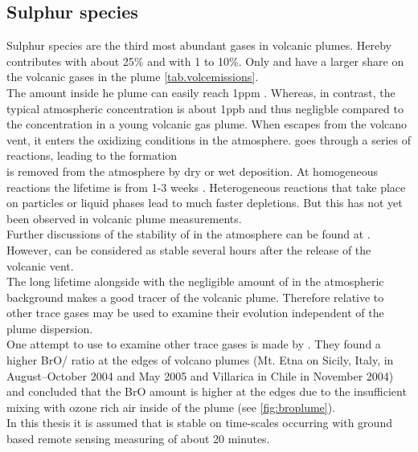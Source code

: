 \documentclass  [
  paper    = a4,
  BCOR     = 10mm,
  twoside,
  fontsize = 12pt,
  fleqn,
  toc      = bibnumbered,
  toc      = listofnumbered,
  numbers  = noendperiod,
  headings = normal,
  listof   = leveldown,
  version  = 3.03
]                                       {scrreprt}
\begin{document}
\subsection{Sulphur species\label{chap:so2}}
Sulphur species are the third most abundant gases in volcanic plumes. Hereby  contributes with about 25\% and  with 1 to 10\%. Only  and  have a larger share on the volcanic gases in the plume \cref{tab.volcemissions}.\\
The   amount inside he plume can easily reach 1ppm \citep{oppenheimer2003volcanic}. Whereas, in contrast, the typical atmospheric concentration is about 1ppb and thus negligble compared to the concentration in a young volcanic gas plume.
When  escapes from the volcano vent, it enters the oxidizing conditions in the atmosphere.  goes through a series of reactions, leading to the  formation \citep{seinfeld2016atmospheric}\\
 is removed from the atmosphere by dry or wet
deposition. At homogeneous reactions the lifetime is from 1-3 weeks \citep{robock2000volcanic}. Heterogeneous reactions that take place on particles or liquid phases lead to much faster depletions. But this has not yet been observed in volcanic plume measurements.\\
Further discussions of the stability of   in the atmosphere can be found at \citet{lubcke2014optical}.\\
However,  can be considered as stable several hours after the release of the volcanic vent.\\ The long lifetime  alongside with the negligible amount of  in the atmospheric background makes  a good tracer of the volcanic plume.
Therefore relative to other trace gases  may be used to examine their evolution independent of the plume dispersion.\\
One attempt to use  to examine other trace gases is made by \citet{bobrowski2007reactive}. They found a higher BrO/ ratio at the edges of volcano plumes (Mt. Etna on Sicily, Italy, in August–October 2004 and May 2005 and Villarica in Chile in November 2004) and concluded that the BrO amount is higher at the edges due to the insufficient mixing with ozone rich air inside of the plume (see \cref{fig:broplume}).\\
In this thesis it is assumed that   is stable on time-scales occurring with ground based remote sensing measuring of about 20 minutes. \\
%
\end{document}
